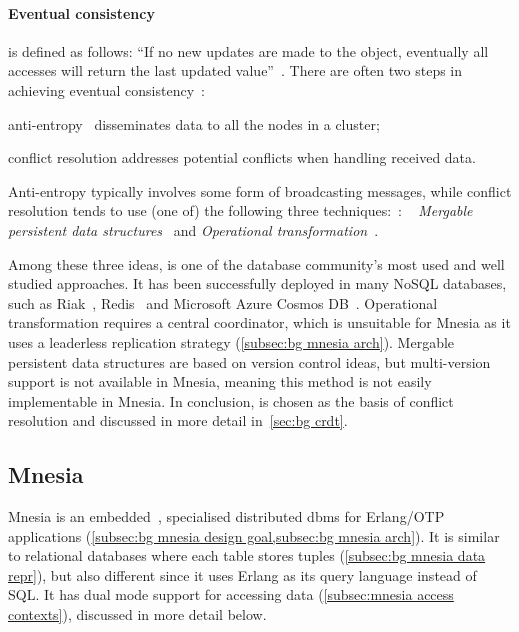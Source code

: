 \paragraph{Eventual consistency} 
is defined as follows: ``If no new updates are made to the object,
eventually all accesses will return the last updated value''~\cite{vogels2008ec}. 
There are often two steps in achieving eventual consistency~\cite{wikipediacontributors2023ec}:
\begin{enumerate*}[(i)]
  \item anti-entropy~\cite{demers1987epidemic} disseminates data to all the nodes 
  in a cluster;
  \item conflict resolution addresses potential conflicts when handling received data.
\end{enumerate*}

Anti-entropy typically involves some form of broadcasting messages, while conflict
resolution tends to use (one of) the following three techniques:~\cite{kleppmann2017DDIA}:
\emph{}~\cite{shapiro2011CRDT,preguica2018CRDT}
\emph{Mergable persistent data structures}~\cite{farinier2015mergable} and
\emph{Operational transformation}~\cite{ellis1989ot}. 

Among these three ideas,  is one of the 
database community's most used and well studied approaches. It has been
successfully deployed in many NoSQL databases, such as 
Riak~\cite{klophaus2010Riak}, Redis~\cite{redis2022rediscrdt} and Microsoft Azure 
Cosmos DB~\cite{shukla2018CosmosDB}. Operational transformation requires a central 
coordinator, which
is unsuitable for Mnesia as it uses a leaderless replication strategy (\cref{subsec:bg mnesia arch}). 
Mergable persistent data structures are based on version
control ideas, but multi-version support is not available in Mnesia,
meaning this method is not easily implementable in Mnesia. In conclusion,
 is chosen as the basis of conflict resolution and discussed in
more detail in~\cref{sec:bg crdt}.


\subsection{Mnesia} \label{sec:bg mnesia}

Mnesia is an embedded~\cite{raasveldt2019DuckDB},
specialised distributed \acrshort{dbms} for Erlang/OTP 
applications (\cref{subsec:bg mnesia design goal,subsec:bg mnesia arch}).
It is similar to relational databases where each table stores 
tuples (\cref{subsec:bg mnesia data repr}), but also
different since it uses Erlang as its query language instead of SQL\@.
It has dual mode support for accessing data (\cref{subsec:mnesia access contexts}),
discussed in more detail below.

